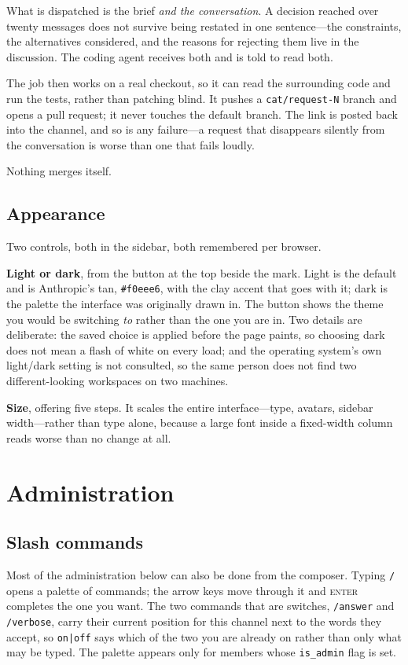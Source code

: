 \documentclass[11pt,letterpaper]{article}
\begin{document}
What is dispatched is the brief \emph{and the conversation}. A decision reached
over twenty messages does not survive being restated in one sentence---the
constraints, the alternatives considered, and the reasons for rejecting them
live in the discussion. The coding agent receives both and is told to read
both.

The job then works on a real checkout, so it can read the surrounding code and
run the tests, rather than patching blind. It pushes a \texttt{cat/request-N}
branch and opens a pull request; it never touches the default branch. The link
is posted back into the channel, and so is any failure---a request that
disappears silently from the conversation is worse than one that fails loudly.

Nothing merges itself.

\subsection{Appearance}

Two controls, both in the sidebar, both remembered per browser.

\textbf{Light or dark}, from the button at the top beside the mark. Light is
the default and is Anthropic's tan, \texttt{\#f0eee6}, with the clay accent
that goes with it; dark is the palette the interface was originally drawn in.
The button shows the theme you would be switching \emph{to} rather than the one
you are in. Two details are deliberate: the saved choice is applied before the
page paints, so choosing dark does not mean a flash of white on every load; and
the operating system's own light/dark setting is not consulted, so the same
person does not find two different-looking workspaces on two machines.

\textbf{Size}, offering five steps. It scales the entire interface---type,
avatars, sidebar width---rather than type alone, because a large font inside a
fixed-width column reads worse than no change at all.

\section{Administration}

\subsection{Slash commands}
\label{sec:slash}

Most of the administration below can also be done from the composer. Typing
\texttt{/} opens a palette of commands; the arrow keys move through it and
\textsc{enter} completes the one you want. The two commands that are switches,
\texttt{/answer} and \texttt{/verbose}, carry their current position for this
channel next to the words they accept, so \texttt{on|off} says which of the
two you are already on rather than only what may be typed. The palette appears
only for members whose \texttt{is\_admin} flag is set.
\end{document}
